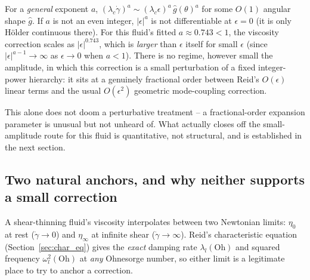 \begin{notebox}
For a \emph{general} exponent $a$, $(\lambda_c\dot\gamma)^a\sim
(\lambda_c\epsilon)^a\,\hat g(\theta)^a$ for some $O(1)$ angular shape
$\hat g$. If $a$ is not an even integer, $|\epsilon|^a$ is not differentiable
at $\epsilon=0$ (it is only H\"older continuous there). For this fluid's
fitted $a\approx 0.743 <1$, the viscosity correction scales as
$|\epsilon|^{0.743}$, which is \emph{larger} than $\epsilon$ itself for small
$\epsilon$ (since $|\epsilon|^{a-1}\to\infty$ as $\epsilon\to0$ when $a<1$).
There is no regime, however small the amplitude, in which this correction is
a small perturbation of a fixed integer-power hierarchy: it sits at a
genuinely fractional order between Reid's $O(\epsilon)$ linear terms and the
usual $O(\epsilon^2)$ geometric mode-coupling correction.
\end{notebox}

This alone does not doom a perturbative treatment -- a fractional-order
expansion parameter is unusual but not unheard of. What actually closes off
the small-amplitude route for this fluid is quantitative, not structural,
and is established in the next section.

\subsection{Two natural anchors, and why neither supports a small correction}
\label{sec:cy_anchors}

A shear-thinning fluid's viscosity interpolates between two Newtonian
limits: $\eta_0$ at rest ($\dot\gamma\to0$) and $\eta_\infty$ at infinite
shear ($\dot\gamma\to\infty$). Reid's characteristic equation
(Section~\ref{sec:char_eq}) gives the \emph{exact} damping rate
$\lambda_l(\mathrm{Oh})$ and squared frequency $\omega_l^2(\mathrm{Oh})$ at
\emph{any} Ohnesorge number, so either limit is a legitimate place to try to
anchor a correction.

